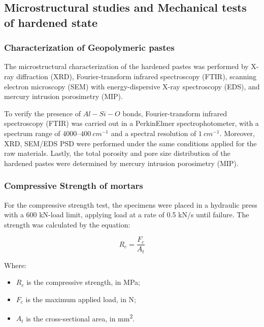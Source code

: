 \subsection{Microstructural studies and Mechanical tests of hardened state}
\label{sec:microstructural_studies_mechanical_tests_hardened_state}

\subsubsection{Characterization of Geopolymeric pastes}
\label{sec:characterization_geopolymeric_pastes}

The microstructural characterization of the hardened pastes was performed by X-ray diffraction (XRD), Fourier-transform infrared spectroscopy (FTIR), scanning electron microscopy (SEM) with energy-dispersive X-ray spectroscopy (EDS), and mercury intrusion porosimetry (MIP).

To verify the presence of $Al-Si-O$ bonds, Fourier-transform infrared spectroscopy (FTIR) was carried out in a PerkinElmer spectrophotometer, with a spectrum range of $4000$–$400\ cm^{-1}$ and a spectral resolution of $1\ cm^{-1}$.
Moreover, XRD, SEM/EDS PSD were performed under the same conditions applied for the raw materials.
Lastly, the total porosity and pore size distribution of the hardened pastes were determined by mercury intrusion porosimetry (MIP).

\subsubsection{Compressive Strength of mortars}
\label{sec:compressive_strength}

For the compressive strength test, the specimens were placed in a hydraulic press with  a 600 kN-load limit, applying load at a rate of 0.5 kN/s until failure. The strength was calculated by the equation:

\begin{equation}
    \label{eq:compressive_strength}
    R_c = \frac{F_c}{A_t}
\end{equation}

Where:
\begin{itemize}
    \item $R_c$ is the compressive strength, in MPa;
    \item $F_c$ is the maximum applied load, in N;
    \item $A_t$ is the cross-sectional area, in mm\textsuperscript{2}.
\end{itemize}

